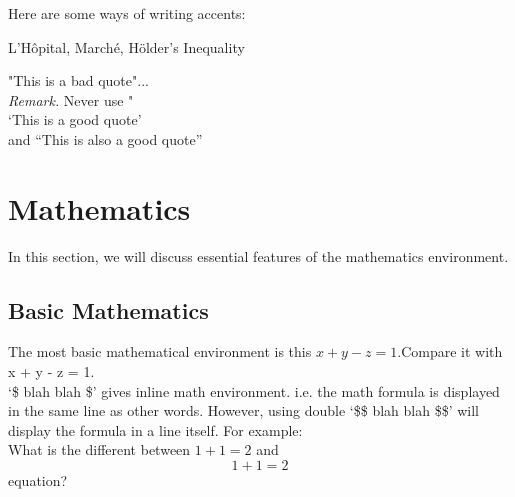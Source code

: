 \documentclass{article} %
\begin{document}
			Here are some ways of writing accents:			
			\begin{center}
				L'H\^{o}pital, March\'{e}, H\"{o}lder's Inequality
			\end{center}
			"This is a bad quote"...\\[3mm]
			\emph{Remark.} Never use "\\[3mm]
			`This is a good quote'\\ %
			and ``This is also a good quote''
	
	\newpage
	\section{Mathematics}
		In this section, we will discuss essential features of the mathematics environment.
		\subsection{Basic Mathematics}
			The most basic mathematical environment is this $x + y - z = 1$.Compare it with x + y - z = 1.\\
			`\$ blah blah \$' gives inline math environment. i.e. the math formula is displayed in the same line as other words. However, using double `\$\$ blah blah \$\$' will display the formula in a line itself. For example:\\
			What is the different between $ 1+1=2$ and $$1+1=2$$ equation?\\
			
\end{document}
